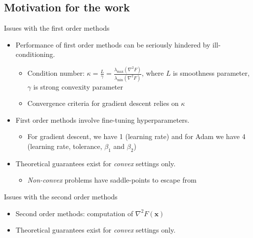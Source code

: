 \documentclass{beamer}
\newcommand{\h}{\nabla^{2}}
\newcommand{\xbold}{\mathbf{x}}
\newcommand{\mineig}{\lambda_{\min}}
\newcommand{\maxeig}{\lambda_{\max}}
\begin{document}
\subsection{Motivation for the work}
\begin{frame}{Issues with the first order methods}
  \begin{itemize}
  \item<1->{
    Performance of first order methods can be seriously hindered by ill-conditioning.
    \begin{itemize}    
        \item<2->{Condition number: \(\kappa = \frac{L}{\gamma} = \frac{\maxeig(\h F)}{\mineig(\h F)}\), where \(L\) is smoothness parameter, \(\gamma\) is strong convexity parameter}
        \item<3->{Convergence criteria for gradient descent relies on \(\kappa\)} %
    \end{itemize}
  }
  \item<4->{
    First order methods involve fine-tuning hyperparameters.
    \begin{itemize}    
        \item<5->{For gradient descent, we have 1 (learning rate) and for Adam we have 4 (learning rate, tolerance, \(\beta_{1}\) and \(\beta_{2}\))}
    \end{itemize}
  }
  \item<6->{
    Theoretical guarantees exist for \emph{convex} settings only.
    \begin{itemize}    
        \item<7->{\emph{Non-convex} problems have saddle-points to escape from}
    \end{itemize}
  }
  \end{itemize}
\end{frame}

\begin{frame}{Issues with the second order methods}
  \begin{itemize}
  \item<1-> {
    Second order methods: computation of \(\h F(\xbold)\)
    \begin{itemize}
    \end{itemize}
  }
  \item<4->{
    Theoretical guarantees exist for \emph{convex} settings only.
  } %
  \end{itemize}
\end{frame}
\end{document}
